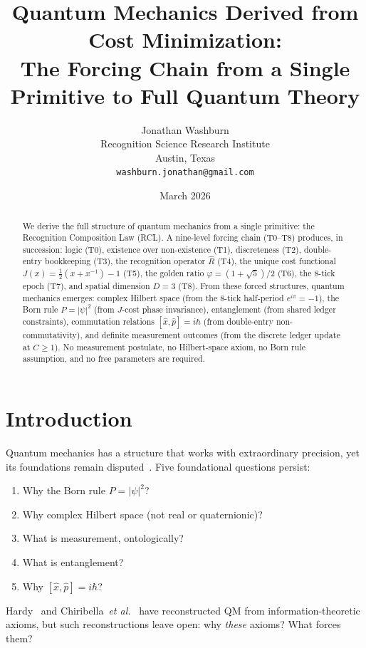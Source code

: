 \documentclass[12pt,a4paper]{article}
\title{Quantum Mechanics Derived from Cost Minimization:\\
The Forcing Chain from a Single Primitive to Full Quantum Theory}
\author{Jonathan Washburn\\
Recognition Science Research Institute\\
Austin, Texas\\
\texttt{washburn.jonathan@gmail.com}}
\date{March 2026}
\theoremstyle{definition}
\theoremstyle{remark}
\begin{document}
\maketitle

\begin{abstract}
We derive the full structure of quantum mechanics from a single
primitive: the Recognition Composition Law (RCL).  A nine-level forcing
chain (T0--T8) produces, in succession: logic (T0), existence over
non-existence (T1), discreteness (T2), double-entry bookkeeping (T3),
the recognition operator $\widehat{R}$ (T4), the unique cost functional
$J(x) = \tfrac{1}{2}(x + x^{-1}) - 1$ (T5), the golden ratio
$\varphi = (1+\sqrt{5})/2$ (T6), the 8-tick epoch (T7), and spatial
dimension $D = 3$ (T8).  From these forced structures, quantum
mechanics emerges: complex Hilbert space (from the 8-tick half-period
$e^{i\pi} = -1$), the Born rule $P = |\psi|^2$ (from $J$-cost phase
invariance), entanglement (from shared ledger constraints),
commutation relations $[\hat{x}, \hat{p}] = i\hbar$ (from double-entry
non-commutativity), and definite measurement outcomes (from the
discrete ledger update at $C \geq 1$).  No measurement postulate, no
Hilbert-space axiom, no Born rule assumption, and no free parameters
are required.  \end{abstract}

\section{Introduction}

Quantum mechanics has a structure that works with extraordinary
precision, yet its foundations remain disputed~\cite{Hardy2001,
Chiribella2011}.  Five foundational questions persist:
\begin{enumerate}
  \item Why the Born rule $P = |\psi|^2$?
  \item Why complex Hilbert space (not real or quaternionic)?
  \item What is measurement, ontologically?
  \item What is entanglement?
  \item Why $[\hat{x}, \hat{p}] = i\hbar$?
\end{enumerate}

Hardy~\cite{Hardy2001} and Chiribella~\emph{et al.}~\cite{Chiribella2011}
have reconstructed QM from information-theoretic axioms, but such
reconstructions leave open: why \emph{these} axioms?  What forces them?
\end{document}
